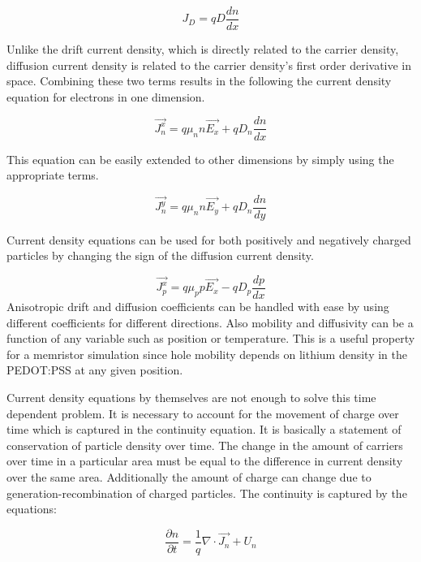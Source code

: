 \begin{doublespace}
\begin{equation}
J_D=qD\frac{dn}{dx}
\end{equation}

Unlike the drift current density, which is directly related to the carrier density, diffusion current density is related to the carrier density's first order derivative in space. Combining these two terms results in the following the current density equation for electrons in one dimension.

\begin{equation}
\vec{J_n^x}=q \mu_{n} n \vec{E_x}+qD_{n} \frac{dn}{dx} 
\label{cdenn}
\end{equation}

This equation can be easily extended to other dimensions by simply using the appropriate terms.

\begin{equation}
\vec{J_n^y}=q \mu_{n} n \vec{E_y}+qD_{n} \frac{dn}{dy} 
\end{equation}

Current density equations can be used for both positively and negatively charged particles by changing the sign of the diffusion current density.

\begin{equation}
\vec{J_p^x}=q \mu_{p} p \vec{E_x}-qD_{p} \frac{dp}{dx} 
\label{cdenp}
\end{equation}
Anisotropic drift and diffusion coefficients can be handled with ease by using different coefficients for different directions. Also mobility and diffusivity can be a function of any variable such as position or temperature. This is a useful property for a memristor simulation since hole mobility depends on lithium density in the PEDOT:PSS at any given position. 

Current density equations by themselves are not enough to solve this time dependent problem. It is necessary to account for the movement of charge over time which is captured in the continuity equation. It is basically a statement of conservation of particle density over time. The change in the amount of carriers over time in a particular area must be equal to the difference in current density over the same area. Additionally the amount of charge can change due to generation-recombination of charged particles. The continuity is captured by the equations:


\begin{equation}
\frac{\partial n}{\partial t}=\frac{1}{q}\nabla \cdot \vec{J_n}+U_{n}
\label{conn}
\end{equation}


\end{doublespace}
